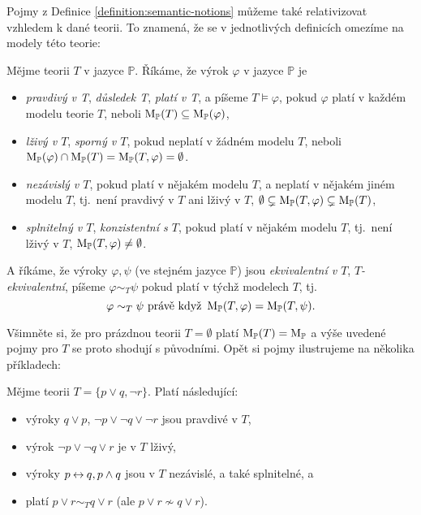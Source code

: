 Pojmy z Definice \ref{definition:semantic-notions} můžeme také relativizovat vzhledem k dané teorii. To znamená, že se v jednotlivých definicích omezíme na modely této teorie:

\begin{definition}
    Mějme teorii $T$ v jazyce $\mathbb P$. Říkáme, že výrok $\varphi$ v jazyce $\mathbb P$ je
    \begin{itemize}
        \item \emph{pravdivý v T}, \emph{důsledek T}, \emph{platí v T}, a píšeme $T \models \varphi$, pokud $\varphi$ platí v každém modelu teorie $T$, neboli $\operatorname{M}_\mathbb P(T)\subseteq \operatorname{M}_\mathbb P(\varphi)$,
        \item \emph{lživý v $T$}, \emph{sporný v $T$}, pokud neplatí v žádném modelu $T$, neboli $\operatorname{M}_\mathbb P(\varphi)\cap\operatorname{M}_\mathbb P(T)=\operatorname{M}_\mathbb P(T,\varphi)=\emptyset$.
        \item \emph{nezávislý v $T$}, pokud platí v nějakém modelu $T$, a neplatí v nějakém jiném modelu $T$, tj.\ není pravdivý v $T$ ani lživý v $T$, $\emptyset\subsetneq\operatorname{M}_\mathbb P(T,\varphi)\subsetneq\operatorname{M}_\mathbb P(T)$,
        \item \emph{splnitelný v $T$}, \emph{konzistentní s $T$}, pokud platí v nějakém modelu $T$, tj.\ není lživý v $T$, $\operatorname{M}_\mathbb P(T,\varphi)\neq\emptyset$.
    \end{itemize}
    A říkáme, že výroky $\varphi,\psi$ (ve stejném jazyce $\mathbb P$) jsou \emph{ekvivalentní v $T$}, \emph{$T$-ekvivalentní}, píšeme $\varphi\sim_T\psi$ pokud platí v týchž modelech $T$, tj.\
    $$
    \varphi\sim_T\psi\text{ právě když }\operatorname{M}_\mathbb P(T,\varphi)=\operatorname{M}_\mathbb P(T,\psi).
    $$
    \end{definition}

Všimněte si, že pro prázdnou teorii $T=\emptyset$ platí $\operatorname{M}_\mathbb P(T)=\operatorname{M}_\mathbb P$ a výše uvedené pojmy pro $T$ se proto shodují s původními. Opět si pojmy ilustrujeme na několika příkladech:

\begin{example} Mějme teorii $T=\{p\lor q,\neg r\}$. Platí následující:
    \begin{itemize}
        \item výroky $q\lor p$, $\neg p\lor\neg q\lor \neg r$ jsou pravdivé v $T$,
        \item výrok $\neg p\lor\neg q\lor r$ je v $T$ lživý,
        \item výroky $p\mathbin{\leftrightarrow} q, p\land q$ jsou v $T$ nezávislé, a také splnitelné, a
        \item platí $p\lor r\sim_T q\lor r$ (ale $p\lor r\not\sim q\lor r$).
    \end{itemize}      
\end{example}


